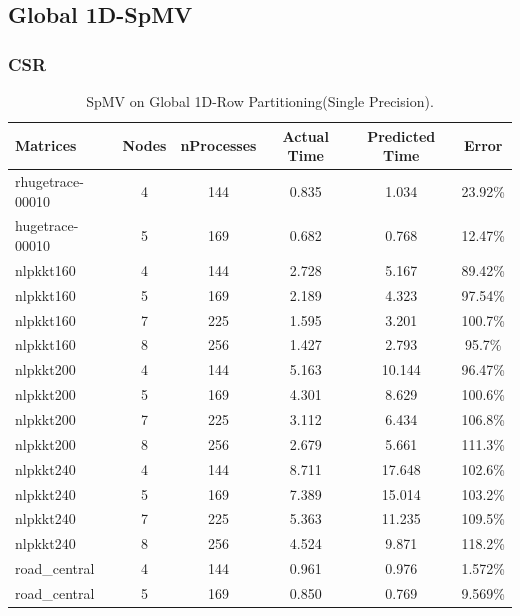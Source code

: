 \documentclass[conference, 10ppt]{IEEEtran}
\begin{document}
\subsection{Global 1D-SpMV}
\subsubsection{CSR}
\begin{table}[htb]
\caption{SpMV on Global 1D-Row Partitioning(Single Precision).}
\label{tab:spmv-gk-single}
\centering
\begin{tabular}[c]{| l | c | c | c | c | c |}
\hline
Matrices & Nodes & nProcesses & Actual Time & Predicted Time & Error \\ \hline
rhugetrace-00010 & 4 & 144 & 0.835 & 1.034 & 23.92\% \\ \hline
hugetrace-00010 & 5 & 169 & 0.682 & 0.768 & 12.47\% \\ \hline
nlpkkt160 & 4 & 144 & 2.728 & 5.167 & 89.42\% \\ \hline
nlpkkt160 & 5 & 169 & 2.189 & 4.323 & 97.54\% \\ \hline
nlpkkt160 & 7 & 225 & 1.595 & 3.201 & 100.7\% \\ \hline
nlpkkt160 & 8 & 256 & 1.427 & 2.793 & 95.7\% \\ \hline
nlpkkt200 & 4 & 144 & 5.163 & 10.144 & 96.47\% \\ \hline
nlpkkt200 & 5 & 169 & 4.301 & 8.629 & 100.6\% \\ \hline
nlpkkt200 & 7 & 225 & 3.112 & 6.434 & 106.8\% \\ \hline
nlpkkt200 & 8 & 256 & 2.679 & 5.661 & 111.3\% \\ \hline
nlpkkt240 & 4 & 144 & 8.711 & 17.648 & 102.6\% \\ \hline
nlpkkt240 & 5 & 169 & 7.389 & 15.014 & 103.2\% \\ \hline
nlpkkt240 & 7 & 225 & 5.363 & 11.235 & 109.5\% \\ \hline
nlpkkt240 & 8 & 256 & 4.524 & 9.871 & 118.2\% \\ \hline
road\_central & 4 & 144 & 0.961 & 0.976 & 1.572\% \\ \hline
road\_central & 5 & 169 & 0.850 & 0.769 & 9.569\% \\ \hline

\end{tabular}
\end{table}




\end{document}
